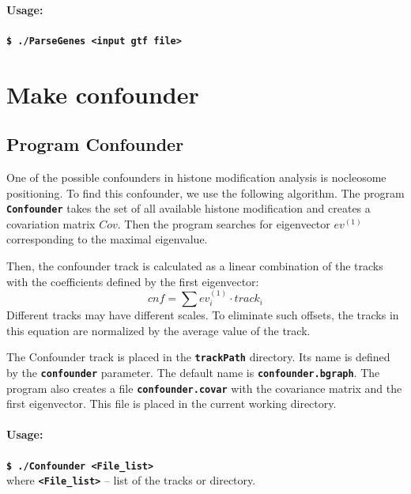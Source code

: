 \documentclass{article}
\newcommand{\prm}[1]{\texttt{\textbf{{#1}}}}
\begin{document}
\paragraph{Usage:}
\prm{\$ ./ParseGenes <input gtf file>}

\section{Make confounder}
\subsection{Program Confounder}
One of the possible confounders in histone modification analysis is nocleosome positioning. 
To find this confounder, we use the following algorithm. The program \prm{Confounder} takes the set of all available histone modification and creates a covariation matrix $Cov$.
Then the program searches for eigenvector $ev^{(1)}$ corresponding to the maximal eigenvalue.

Then, the confounder track is calculated as a linear combination of the tracks with the coefficients defined by the first eigenvector:
$$
cnf=\sum ev^{(1)}_i \cdot track_i
$$
Different tracks may have different scales. To eliminate such offsets, the tracks in this equation are normalized by the average value of the track.

The Confounder track is placed in the \prm{trackPath} directory. Its name is defined by the \prm{confounder} parameter. The default name is \prm{confounder.bgraph}. The program also creates a file \prm{confounder.covar} with the covariance matrix and the first eigenvector. This file is placed in the current working directory.

\paragraph{Usage:}
\prm{\$ ./Confounder <File\_list>}\\
where \prm{<File\_list>} -- list of the tracks or directory.

\end{document}
